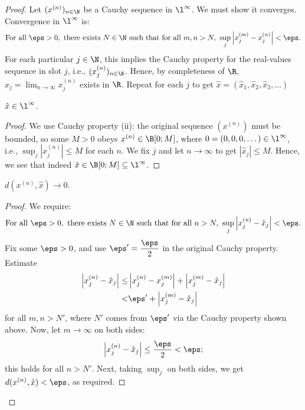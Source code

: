 \begin{proof}
	Let \((x^{(n)})_{n\in\N}\) be a Cauchy sequence in \(\l^{\infty}\). We must show it converges. Convergence in \(\l^{\infty}\) is:
	\begin{equation*}
		\text{For all}~\eps>0,~\text{there exists}~N\in\N~\text{such that for all}~m,n>N,~\sup_j\left|x_j^{(m)}-x_j^{(n)}\right|<\eps.
	\end{equation*}
	For each particular \(j\in\N\), this implies the Cauchy property for the real-values sequence in slot \(j\), i.e., \((x_j^{(n)})_{n\in\N}\). Hence, by completeness of \(\R\), \(x_j=\displaystyle\lim_{n\to\infty}x_j^{(n)}\) exists in \(\R\). Repeat for each \(j\) to get \(\hat{x}=(\hat{x}_1,\hat{x}_2,\hat{x}_3,\dots)\)
	\begin{claim}
		\(\hat{x}\in\l^{\infty}\).
	\end{claim}
	\begin{proof}
		We use Cauchy property (ii): the original sequence \((x^{(n)})\) must be bounded, so some \(M>0\) obeys \(x^{(n)}\in\B[0;M]\), where \(0=(0,0,0,\dots)\in\l^{\infty}\), i.e., \(\displaystyle\sup_j\left|x_j^{(n)}\right|\leq M\) for each \(n\). We fix \(j\) and let \(n\to\infty\) to get \(|\hat{x}_j|\leq M\). Hence, we see that indeed \(\hat{x}\in\B[0;M]\subseteq\l^{\infty}\).
	\end{proof}
	\begin{claim}
		\(d(x^{(n)},\hat{x})\to 0\).
	\end{claim}
	\begin{proof}
		We require:
		\begin{equation*}
			\text{For all}~\eps>0,~\text{there exists}~N\in\N~\text{such that for all}~n>N,~\sup_j\left|x_j^{(n)}-\hat{x}_j\right|<\eps.
		\end{equation*}
		Fix some \(\eps>0\), and use \(\eps'=\displaystyle\frac{\eps}{2}\) in the original Cauchy property. Estimate
		\begin{align*}
			\left|x_j^{(n)}-\hat{x}_j\right|\leq&\left|x_j^{(n)}-x_j^{(m)}\right|+\left|x_j^{(m)}-\hat{x}_j\right|\\
			<&\eps'+\left|x_j^{(m)}-\hat{x}_j\right|
		\end{align*}
		for all \(m,n>N'\), where \(N'\) comes from \(\eps'\) via the Cauchy property shown above. Now, let \(m\to\infty\) on both sides:
		\begin{equation*}
			\left|x_j^{(n)}-\hat{x}_j\right|\leq \frac{\eps}{2}<\eps;
		\end{equation*}
		this holds for all \(n>N'\). Next, taking \(\displaystyle\sup_j\) on both sides, we get \(d(x^{(n)},\hat{x})<\eps\), as required.
	\end{proof}
\end{proof}